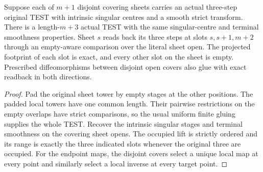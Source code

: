 \begin{theorem}
\label{hir:g8-finite-scheduled-sheet-test}
\leanok
Suppose each of \(m+1\) disjoint covering sheets carries an actual
three-step original TEST with intrinsic singular centres and a
smooth strict transform. There is a length-\(m+3\) actual TEST
with the same singular-centre and terminal smoothness properties.
Sheet \(s\) reads back its three steps at slots \(s,s+1,m+2\)
through an empty-aware comparison over the literal sheet open.
The projected footprint of each slot is exact, and every other
slot on the sheet is empty. Prescribed diffeomorphisms between
disjoint open covers also glue with exact readback in both directions.
\end{theorem}
\begin{proof}
Pad the original sheet tower by empty stages at the other
positions. The padded local towers have one common length.
Their pairwise restrictions on the empty overlaps have strict
comparisons, so the usual uniform finite gluing supplies the
whole TEST. Recover the intrinsic singular stages and terminal
smoothness on the covering sheet opens. The occupied lift is
strictly ordered and its range is exactly the three indicated
slots whenever the original three are occupied. For the endpoint
maps, the disjoint covers select a unique local map at every point
and similarly select a local inverse at every target point.
\end{proof}

